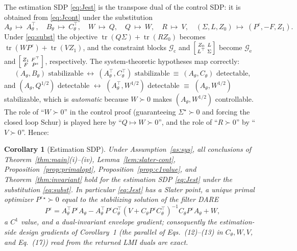 \documentclass[11pt]{article}
\newtheorem{corollary}{Corollary}
\theoremstyle{definition}
\DeclareMathOperator{\tr}{tr}
\newcommand{\Th}{\theta}
\newcommand{\half}{{1/2}}
\newcommand{\Sig}{\Sigma}
\newcommand{\Pe}{P^{\varepsilon}}
\begin{document}
The estimation SDP \eqref{eq:Jest} is the transpose dual of the control SDP: it
is obtained from \eqref{eq:Jcont} under the substitution
\begin{equation}\label{eq:subst}
A_\Th\ \mapsto\ A_\Th^\top,\quad
B_\Th\ \mapsto\ C_\Th^\top,\quad
W\ \mapsto\ Q,\quad
Q\ \mapsto\ W,\quad
R\ \mapsto\ V,\quad
(\Sig,L,Z_0)\ \mapsto\ (\Pe,-F,Z_1).
\end{equation}
Under \eqref{eq:subst} the objective $\tr(Q\Sig)+\tr(RZ_0)$ becomes
$\tr(W\Pe)+\tr(VZ_1)$, and the constraint blocks
$\mathcal G_{\mathrm c}$ and $\begin{bsmallmatrix}Z_0&L\\L^\top&\Sig
\end{bsmallmatrix}$ become $\mathcal G_{\mathrm e}$ and
$\begin{bsmallmatrix}Z_1&F^\top\\F&\Pe\end{bsmallmatrix}$, respectively. The
system-theoretic hypotheses map correctly:
\[
\text{$(A_\Th,B_\Th)$ stabilizable}\ \leftrightarrow\
\text{$(A_\Th^\top,C_\Th^\top)$ stabilizable}\ \equiv\
\text{$(A_\Th,C_\Th)$ detectable},
\]
and $(A_\Th,Q^{\half})$ detectable $\leftrightarrow$
$(A_\Th^\top,W^{\half})$ detectable $\equiv$ $(A_\Th,W^{\half})$ stabilizable,
which is \emph{automatic} because $W\succ0$ makes $(A_\Th,W^{\half})$
controllable. The role of ``$W\succ0$'' in the control proof (guaranteeing
$\Sig^\star\succ0$ and forcing the closed loop Schur) is played here by
``$Q\mapsto W\succ0$'', and the role of ``$R\succ0$'' by ``$V\succ0$''. Hence:

\begin{corollary}[Estimation SDP]\label{cor:est}
Under Assumption~\ref{as:sys}, all conclusions of
Theorem~\ref{thm:main}(i)--(iv), Lemma~\ref{lem:slater-cont},
Proposition~\ref{prop:primalopt}, Proposition~\ref{prop:c1value}, and
Theorem~\ref{thm:invariant} hold for the estimation SDP \eqref{eq:Jest} under the
substitution \eqref{eq:subst}. In particular \eqref{eq:Jest} has a Slater point,
a unique primal optimizer $\Pe{}^\star\succ0$ equal to the stabilizing solution
of the filter DARE
\[
\Pe=A_\Th^\top\Pe A_\Th
-A_\Th^\top\Pe C_\Th^\top(V+C_\Th\Pe C_\Th^\top)^{-1}C_\Th\Pe A_\Th+W,
\]
a $C^1$ value, and a dual-invariant envelope gradient; consequently the
estimation-side design gradients of Corollary~1 \textup{(}the parallel of
Eqs.~(12)--(13) in $C_\Th,W,V$, and Eq.~(17)\textup{)} read from the returned LMI
duals are exact.
\end{corollary}
\end{document}

